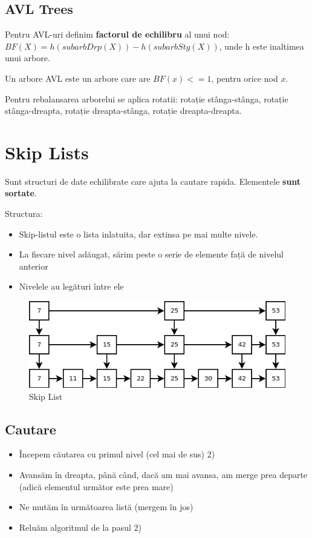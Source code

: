 \documentclass[11pt,a4paper]{article}
\theoremstyle{definition}
\theoremstyle{plain}
\theoremstyle{remark}
\begin{document}
\subsection{AVL Trees}
Pentru AVL-uri definim \textbf{factorul de echilibru} al unui nod: $BF(X) = h(subarbDrp(X)) - h(subarbStg(X))$, unde h este inaltimea unui arbore.

Un arbore AVL este un arbore care are $BF(x) <= 1$, pentru orice nod $x$.

Pentru rebalansarea arborelui se aplica rotatii: rotație stânga-stânga, rotație stânga-dreapta, rotație dreapta-stânga, rotație dreapta-dreapta.

\section{Skip Lists}
Sunt structuri de date echilibrate care ajuta la cautare rapida. Elementele \textbf{sunt sortate}.

Structura:
\begin{itemize}
    \item Skip-listul este o lista inlatuita, dar extinsa pe mai multe nivele.
    \item La ﬁecare nivel adăugat, sărim peste o serie de elemente față de nivelul anterior
    \item Nivelele au legături între ele
\end{itemize}

\begin{figure}[H]
    \centering
    \includegraphics[width=0.75\linewidth]{skip-lists.png}
    \caption{Skip List}
    \label{fig:enter-label}
\end{figure}

\subsection*{Cautare}

\begin{itemize}
    \item Începem căutarea cu primul nivel (cel mai de sus) 2)
    \item Avansăm în dreapta, până când, dacă am mai avansa, am merge prea departe (adică elementul următor este prea mare)
    \item Ne mutăm în următoarea listă (mergem în jos)
    \item Reluăm algoritmul de la pasul 2)

\end{itemize}
\end{document}
